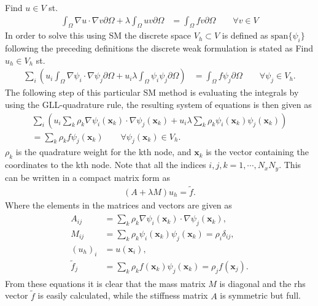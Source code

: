 Find $u\in V$ st. 
%
\begin{align}
    \int_{\Omega}\nabla u \cdot \nabla v \partial \Omega + \lambda \int_{\Omega} u v\partial \Omega 
    &= \int_{\Omega}f v\partial \Omega \qquad \forall v \in V
    \label{eq:Helmholtzweak}
\end{align}
%
In order to solve this using SM the discrete space $V_h \subset V$ is defined as $\text{span}\{\psi_i\}$ following the preceding definitions 
the discrete weak formulation is stated as 
Find $u_h\in V_h$ st. 
%
\begin{align}
    \sum_i\left(  u_i\int_{\Omega}\nabla \psi_i \cdot \nabla \psi_j \partial \Omega + u_i\lambda \int_{\Omega} \psi_i \psi_j\partial \Omega \right)
    &= \int_{\Omega}f \psi_j\partial \Omega \qquad \forall \psi_j \in V_h.
    \label{eq:Helmholtzdiscrete}
\end{align}
%
The following step of this particular SM method is evaluating the integrals by using the GLL-quadrature rule, the resulting system of equations 
is then given as 
%
\begin{align}
    \sum_i\left(  u_i\sum_k \rho_k\nabla \psi_i(\mathbf{x}_{k}) \cdot \nabla \psi_j(\mathbf{x}_{k}) + u_i\lambda \sum_k \rho_k \psi_i(\mathbf{x}_{k}) \psi_j(\mathbf{x}_{k})\right)\\
     = \sum_k \rho_kf \psi_j(\mathbf{x}_{k})\qquad \forall \psi_j(\mathbf{x}_{k}) \in V_h.
    \label{eq:Helmholtzquad}
\end{align}
%
$\rho_k$ is the quadrature weight for the kth node, and $\mathbf{x}_k$ is the vector containing the coordinates to the kth node.
Note that all the indices $i,j,k=1,\cdots,N_xN_y$.
This can be written in a compact matrix form as 
\begin{align}
    (A+\lambda M)u_h = \tilde f.
    \label{eq:Helmholtzmat}
\end{align}
Where the elements in the matrices and vectors are given as 
\begin{align}
    \begin{split}
        A_{ij} &= \sum_k \rho_k\nabla \psi_i(\mathbf{x}_{k}) \cdot \nabla \psi_j(\mathbf{x}_{k}),\\
        M_{ij} &= \sum_k \rho_k \psi_i(\mathbf{x}_{k}) \psi_j(\mathbf{x}_{k}) = \rho_i\delta_{ij},\\
        (u_h)_i & = u(\mathbf{x}_i), \\
        \tilde f_j &= \sum_k \rho_k f(\mathbf{x}_{k}) \psi_j(\mathbf{x}_{k}) = \rho_j f(\mathbf{x}_{j}).
    \end{split}
    \label{eq:Helmholtzmatelem}
\end{align}
From these equations it is clear that the mass matrix $M$ is diagonal and the rhs vector $\tilde f$ is easily calculated, 
while the stiffness matrix $A$ is symmetric but full.

